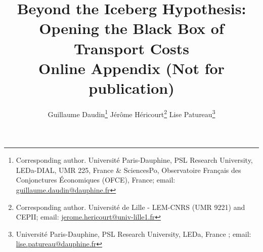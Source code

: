 \documentclass[11pt,twoside, authoryear]{elsarticle}
\begin{document}
\title{\textbf{Beyond the Iceberg Hypothesis: \\Opening the Black Box of Transport Costs}\\Online Appendix (Not for publication)}

\author{Guillaume Daudin\footnote{\noindent Corresponding author. Universit\'{e} Paris-Dauphine, PSL Research University, LEDa-DIAL, UMR 225, France \&
SciencesPo, Observatoire Français des Conjonctures \'{E}conomiques (OFCE), France; email: \url{guillaume.daudin@dauphine.fr}} \qquad \quad Jérôme Héricourt\footnote{\noindent Corresponding author. Université de Lille - LEM-CNRS (UMR 9221) and CEPII; email: \url{jerome.hericourt@univ-lille1.fr}} \qquad \quad Lise Patureau\footnote{\noindent Universit\'{e} Paris-Dauphine, PSL Research University, LEDa, France ; email: \url{lise.patureau@dauphine.fr}}}
%
%
%



\maketitle






\tableofcontents
\vspace{1cm}
\newpage
\listoftables

\newpage
\end{document}
